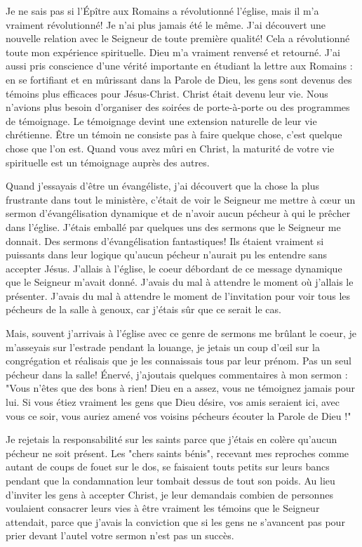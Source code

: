Je ne sais pas si l’Épître aux Romains a révolutionné l’église, mais il m'a vraiment révolutionné! Je n'ai plus jamais été
le même. J'ai découvert une nouvelle relation avec le Seigneur de toute première qualité! Cela a révolutionné toute
mon expérience spirituelle. Dieu m’a vraiment renversé et retourné. J’ai aussi pris conscience d'une vérité importante
en étudiant la lettre aux Romains : en se fortifiant et en mûrissant dans la Parole de Dieu, les gens sont devenus des
témoins plus efficaces pour Jésus-Christ. Christ était devenu leur vie. Nous n'avions plus besoin d'organiser des
soirées de porte-à-porte ou des programmes de témoignage. Le témoignage devint une extension naturelle de leur
vie chrétienne. Être un témoin ne consiste pas à faire quelque chose, c'est quelque chose que l'on est. Quand vous
avez mûri en Christ, la maturité de votre vie spirituelle est un témoignage auprès des autres.

Quand j'essayais d’être un évangéliste, j’ai découvert que la chose la plus frustrante dans tout le ministère, c’était de
voir le Seigneur me mettre à cœur un sermon d’évangélisation dynamique et de n’avoir aucun pécheur à qui le
prêcher dans l’église. J’étais emballé par quelques uns des sermons que le Seigneur me donnait. Des sermons
d’évangélisation fantastiques! Ils étaient vraiment si puissants dans leur logique qu’aucun pécheur n’aurait pu les
entendre sans accepter Jésus. J'allais à l’église, le coeur débordant de ce message dynamique que le Seigneur m’avait
donné. J'avais du mal à attendre le moment où j’allais le présenter. J'avais du mal à attendre le moment de l’invitation
pour voir tous les pécheurs de la salle à genoux, car j’étais sûr que ce serait le cas.

Mais, souvent j’arrivais à l’église avec ce genre de sermons me brûlant le coeur, je m’asseyais sur l’estrade pendant la
louange, je jetais un coup d'œil sur la congrégation et réalisais que je les connaissais tous par leur prénom. Pas un
seul pécheur dans la salle! Énervé, j’ajoutais quelques commentaires à mon sermon : "Vous n’êtes que des bons à
rien! Dieu en a assez, vous ne témoignez jamais pour lui. Si vous étiez vraiment les gens que Dieu désire, vos amis
seraient ici, avec vous ce soir, vous auriez amené vos voisins pécheurs écouter la Parole de Dieu !"

Je rejetais la responsabilité sur les saints parce que j’étais en colère qu'aucun pécheur ne soit présent. Les "chers
saints bénis", recevant mes reproches comme autant de coups de fouet sur le dos, se faisaient touts petits sur leurs
bancs pendant que la condamnation leur tombait dessus de tout son poids. Au lieu d’inviter les gens à accepter Christ,
je leur demandais combien de personnes voulaient consacrer leurs vies à être vraiment les témoins que le Seigneur
attendait, parce que j’avais la conviction que si les gens ne s’avancent pas pour prier devant l’autel votre sermon n’est
pas un succès.

